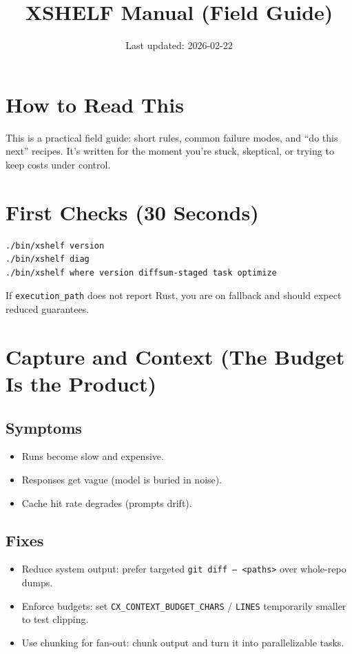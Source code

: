 \documentclass[11pt]{article}
\title{XSHELF Manual (Field Guide)}
\author{}
\date{Last updated: 2026-02-22}
\begin{document}
\maketitle
\vspace{-0.6em}

\section*{How to Read This}
This is a practical field guide: short rules, common failure modes, and ``do this next'' recipes.
It’s written for the moment you’re stuck, skeptical, or trying to keep costs under control.

\section{First Checks (30 Seconds)}
\begin{lstlisting}[style=cx]
./bin/xshelf version
./bin/xshelf diag
./bin/xshelf where version diffsum-staged task optimize
\end{lstlisting}

If \texttt{execution\_path} does not report Rust, you are on fallback and should expect reduced guarantees.

\section{Capture and Context (The Budget Is the Product)}
\subsection*{Symptoms}
\begin{itemize}
  \item Runs become slow and expensive.
  \item Responses get vague (model is buried in noise).
  \item Cache hit rate degrades (prompts drift).
\end{itemize}

\subsection*{Fixes}
\begin{itemize}
  \item Reduce system output: prefer targeted \texttt{git diff -- <paths>} over whole-repo dumps.
  \item Enforce budgets: set \texttt{CX\_CONTEXT\_BUDGET\_CHARS} / \texttt{LINES} temporarily smaller to test clipping.
  \item Use chunking for fan-out: chunk output and turn it into parallelizable tasks.
\end{itemize}
\end{document}
